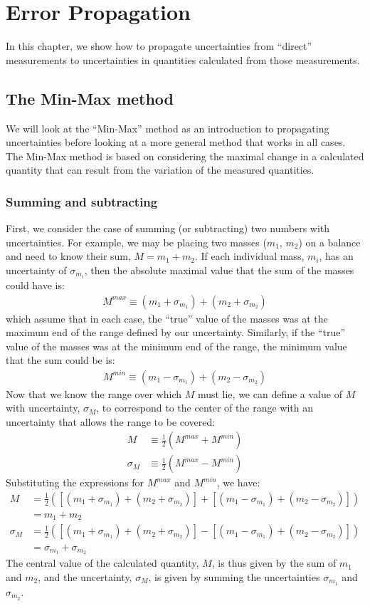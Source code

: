 \chapter{Error Propagation}
\label{chap:ErrorPropagation}
In this chapter, we show how to propagate uncertainties from ``direct'' measurements to uncertainties in quantities calculated from those measurements. 

\section{The Min-Max method}
We will look at the ``Min-Max'' method as an introduction to propagating uncertainties before looking at a more general method that works in all cases. The Min-Max method is based on considering the maximal change in a calculated quantity that can result from the variation of the measured quantities.

\subsection{Summing and subtracting}
First, we consider the case of summing (or subtracting) two numbers with uncertainties. For example, we may be placing two masses ($m_1$, $m_2$) on a balance and need to know their sum, $M=m_1+m_2$. If each individual mass, $m_i$, has an uncertainty of $\sigma_{m_i}$, then the absolute maximal value that the sum of the masses could have is:
\begin{align}
M^{max}\equiv(m_1+\sigma_{m_1})+(m_2+\sigma_{m_2})
\end{align}
which assume that in each case, the ``true'' value of the masses was at the maximum end of the range defined by our uncertainty. Similarly, if the ``true'' value of the masses was at the minimum end of the range, the minimum value that the sum could be is:
\begin{align}
M^{min}\equiv(m_1-\sigma_{m_1})+(m_2-\sigma_{m_2})
\end{align}
Now that we know the range over which $M$ must lie, we can define a value of $M$ with uncertainty, $\sigma_{M}$, to correspond to the center of the range with an uncertainty that allows the range to be covered:
\begin{align}
M&\equiv\frac{1}{2}(M^{max}+M^{min})\nonumber\\
\sigma_{M}&\equiv\frac{1}{2}(M^{max}-M^{min})
\end{align}
Substituting the expressions for $M^{max}$ and $M^{min}$, we have:
\begin{align}
M&=\frac{1}{2}\left(\left[(m_1+\sigma_{m_1})+(m_2+\sigma_{m_2})\right]+ \left[(m_1-\sigma_{m_1})+(m_2-\sigma_{m_2})\right]\right)\nonumber\\
 &=m_1+m_2\nonumber\\
\sigma_{M}&=\frac{1}{2}\left(\left[(m_1+\sigma_{m_1})+(m_2+\sigma_{m_2})\right]-\left[(m_1-\sigma_{m_1})+(m_2-\sigma_{m_2})\right]\right) \nonumber\\
 &=\sigma_{m_1}+ \sigma_{m_2}
\end{align}
The central value of the calculated quantity, $M$, is thus given by the sum of $m_1$ and $m_2$, and the uncertainty, $\sigma_{M}$, is given by summing the uncertainties $\sigma_{m_1}$ and $\sigma_{m_2}$.

